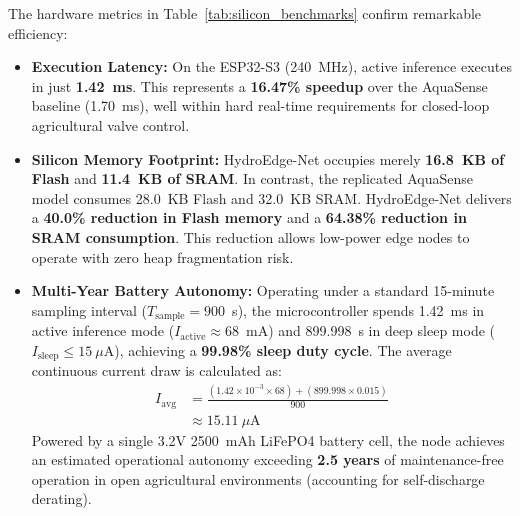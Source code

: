 The hardware metrics in Table~\ref{tab:silicon_benchmarks} confirm remarkable efficiency:
\begin{itemize}
    \item \textbf{Execution Latency:} On the ESP32-S3 (240~MHz), active inference executes in just \textbf{1.42~ms}. This represents a \textbf{16.47\% speedup} over the AquaSense baseline (1.70~ms), well within hard real-time requirements for closed-loop agricultural valve control.
    \item \textbf{Silicon Memory Footprint:} HydroEdge-Net occupies merely \textbf{16.8~KB of Flash} and \textbf{11.4~KB of SRAM}. In contrast, the replicated AquaSense model consumes 28.0~KB Flash and 32.0~KB SRAM. HydroEdge-Net delivers a \textbf{40.0\% reduction in Flash memory} and a \textbf{64.38\% reduction in SRAM consumption}. This reduction allows low-power edge nodes to operate with zero heap fragmentation risk.
    \item \textbf{Multi-Year Battery Autonomy:} Operating under a standard 15-minute sampling interval ($T_{\text{sample}} = 900$~s), the microcontroller spends 1.42~ms in active inference mode ($I_{\text{active}} \approx 68$~mA) and 899.998~s in deep sleep mode ($I_{\text{sleep}} \le 15\ \mu\text{A}$), achieving a \textbf{99.98\% sleep duty cycle}. The average continuous current draw is calculated as:
\begin{align}
I_{\text{avg}} &= \frac{(1.42 \times 10^{-3} \times 68) + (899.998 \times 0.015)}{900} \nonumber \\
&\approx 15.11\ \mu\text{A}
\label{eq:avg_current}
\end{align}
Powered by a single 3.2V 2500~mAh LiFePO4 battery cell, the node achieves an estimated operational autonomy exceeding \textbf{2.5 years} of maintenance-free operation in open agricultural environments (accounting for self-discharge derating).
\end{itemize}
